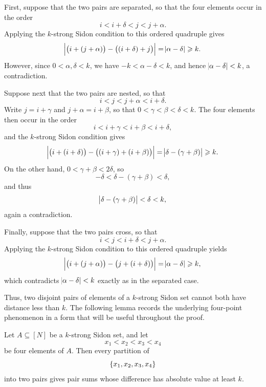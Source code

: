 \documentclass[reqno,a4paper,12pt]{amsart}
\begin{document}
First, suppose that the two pairs are separated, so that the four
elements occur in the order
\[
    i<i+\delta<j<j+\alpha.
\]
Applying the \(k\)-strong Sidon condition to this ordered quadruple
gives
\[
    \abs{\bigl(i+(j+\alpha)\bigr)-\bigl((i+\delta)+j\bigr)}
    =
    \abs{\alpha-\delta}
    \geqslant k.
\]
However, since \(0<\alpha,\delta<k\), we have
\(-k<\alpha-\delta<k\), and hence \(\abs{\alpha-\delta}<k\), a
contradiction.

Suppose next that the two pairs are nested, so that
\[
    i<j<j+\alpha<i+\delta.
\]
Write \(j=i+\gamma\) and \(j+\alpha=i+\beta\), so that
\(0<\gamma<\beta<\delta<k\). The four elements then occur in the
order
\[
    i<i+\gamma<i+\beta<i+\delta,
\]
and the \(k\)-strong Sidon condition gives
\[
    \abs{\bigl(i+(i+\delta)\bigr)-\bigl((i+\gamma)+(i+\beta)\bigr)}
    =
    \abs{\delta-(\gamma+\beta)}
    \geqslant k.
\]
On the other hand, \(0<\gamma+\beta<2\delta\), so
\[
    -\delta<\delta-(\gamma+\beta)<\delta,
\]
and thus
\[
    \abs{\delta-(\gamma+\beta)}<\delta<k,
\]
again a contradiction.

Finally, suppose that the two pairs cross, so that
\[
    i<j<i+\delta<j+\alpha.
\]
Applying the \(k\)-strong Sidon condition to this ordered quadruple
yields
\[
    \abs{\bigl(i+(j+\alpha)\bigr)-\bigl(j+(i+\delta)\bigr)}
    =
    \abs{\alpha-\delta}
    \geqslant k,
\]
which contradicts \(\abs{\alpha-\delta}<k\) exactly as in the
separated case.

Thus, two disjoint pairs of elements of a \(k\)-strong Sidon set
cannot both have distance less than \(k\). The following lemma
records the underlying four-point phenomenon in a form that will be
useful throughout the proof.

\begin{lemma}
    \label{lem:four-point-pairing}
    Let \(A\subseteq[N]\) be a \(k\)-strong Sidon set, and let
    \[
        x_1<x_2<x_3<x_4
    \]
    be four elements of \(A\). Then every partition of
    \[
        \lbrace x_1,x_2,x_3,x_4\rbrace
    \]
    into two pairs gives pair sums whose difference has absolute value
    at least \(k\).
\end{lemma}
\end{document}
